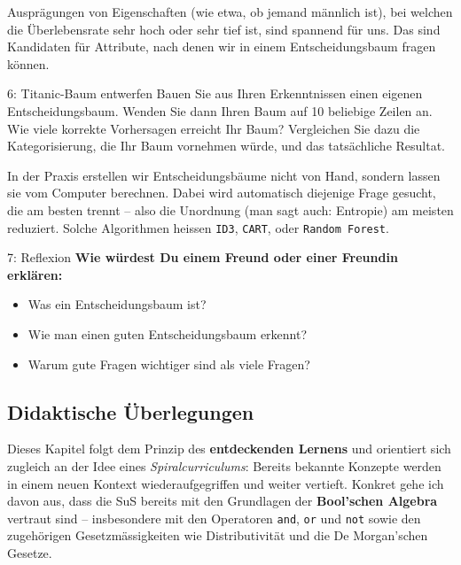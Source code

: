 \begin{lpu}
Ausprägungen von Eigenschaften (wie etwa, ob jemand männlich ist), bei welchen die Überlebensrate sehr hoch oder sehr tief ist, sind spannend für uns. Das sind Kandidaten für Attribute, nach denen wir in einem Entscheidungsbaum fragen können.

\begin{aufgabe}{6: Titanic-Baum entwerfen}
Bauen Sie aus Ihren Erkenntnissen einen eigenen Entscheidungsbaum. Wenden Sie dann Ihren Baum auf 10 beliebige Zeilen an. Wie viele korrekte Vorhersagen erreicht Ihr Baum? Vergleichen Sie dazu die Kategorisierung, die Ihr Baum vornehmen würde, und das tatsächliche Resultat.
\end{aufgabe}

\begin{hinweis}
In der Praxis erstellen wir Entscheidungsbäume nicht von Hand, sondern lassen sie vom Computer berechnen. Dabei wird automatisch diejenige Frage gesucht, die am besten trennt – also die Unordnung (man sagt auch: Entropie) am meisten reduziert. Solche Algorithmen heissen \texttt{ID3}, \texttt{CART}, oder \texttt{Random Forest}.
\end{hinweis}

\begin{aufgabe}{7: Reflexion}
\textbf{Wie würdest Du einem Freund oder einer Freundin erklären:}
\begin{itemize}
  \item Was ein Entscheidungsbaum ist?
  \item Wie man einen guten Entscheidungsbaum erkennt?
  \item Warum gute Fragen wichtiger sind als viele Fragen?
\end{itemize}
\end{aufgabe}
    
\end{lpu}


\subsection*{Didaktische Überlegungen}

Dieses Kapitel folgt dem Prinzip des \textbf{entdeckenden Lernens} und orientiert sich zugleich an der Idee eines \emph{Spiralcurriculums}: Bereits bekannte Konzepte werden in einem neuen Kontext wiederaufgegriffen und weiter vertieft. Konkret gehe ich davon aus, dass die SuS bereits mit den Grundlagen der \textbf{Bool’schen Algebra} vertraut sind – insbesondere mit den Operatoren \texttt{and}, \texttt{or} und \texttt{not} sowie den zugehörigen Gesetzmässigkeiten wie Distributivität und die De Morgan'schen Gesetze.


